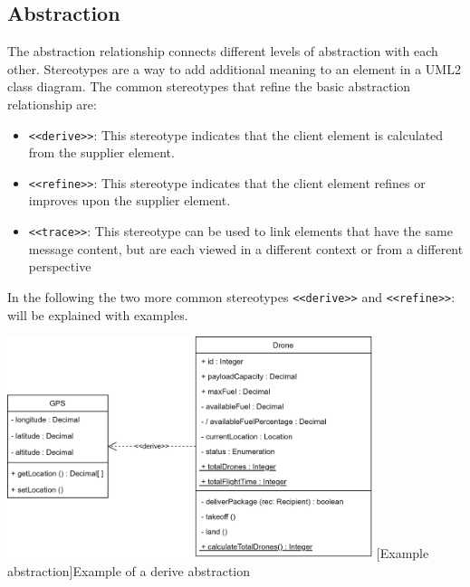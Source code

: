 \documentclass[
	12pt,
    a4paper,
    egregdoesnotlikesansseriftitles, %
    toc=chapterentrywithdots,
    oneside, openany,
    titlepage,
    parskip=half,
    headings=normal,  %
    listof=totoc,
    bibliography=totoc,
    index=totoc,
    captions=tableheading,  %
    listof=flat,
    numbers=noenddot, %
    final]
    {scrbook}
\begin{document}
\subsection{Abstraction}
The abstraction relationship connects different levels of abstraction with each other.
Stereotypes are a way to add additional meaning to an element in a UML2 class diagram. 
The common stereotypes that refine the basic abstraction relationship are: \cite{ibm_dependencies}
\begin{itemize}
	\item \texttt{<<derive>>}: This stereotype indicates that the client element is calculated from the supplier element.
	\item \texttt{<<refine>>}: This stereotype indicates that the client element refines or improves upon the supplier element.
	\item \texttt{<<trace>>}: This stereotype can be used to link elements that have the same message content, but are each viewed in a different context or from a different perspective
\end{itemize}


In the following the two more common stereotypes \texttt{<<derive>>} and \texttt{<<refine>>}: will be explained with examples.


\vspace{1em}
\begin{minipage}{\linewidth}
	\centering
	\includegraphics[width=0.8\textwidth]{figures/dependencies/derive.jpg}
	[Example abstraction]{Example of a derive abstraction}
	\label{fig:derive_example}
\end{minipage}
\vspace{1em}
\end{document}
